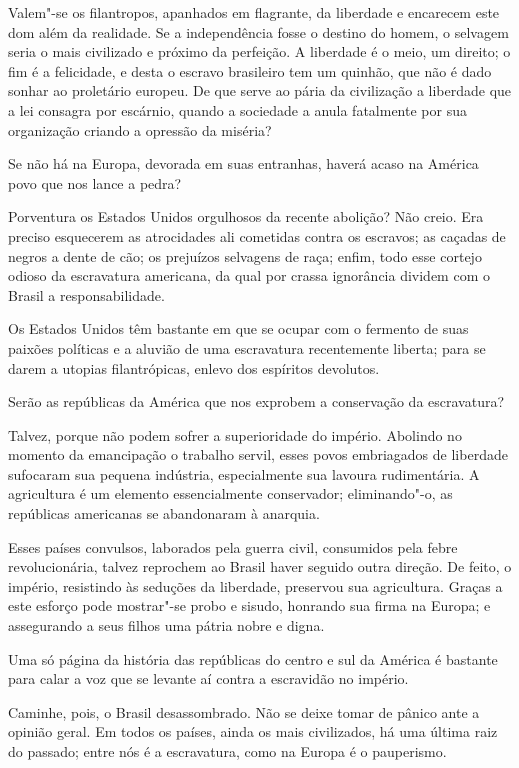  Valem"-se os filantropos, apanhados em flagrante, da liberdade e
encarecem este dom além da realidade. Se a independência fosse o
destino do homem, o selvagem seria o mais civilizado e próximo da
perfeição. A liberdade é o meio, um direito; o fim é a felicidade, e
desta o escravo brasileiro tem um quinhão, que não é dado sonhar ao
proletário europeu. De que serve ao pária da civilização a liberdade
que a lei consagra por escárnio, quando a sociedade a anula fatalmente
por sua organização criando a opressão da miséria? 

 Se não há na Europa, devorada em suas entranhas, haverá acaso na
América povo que nos lance a pedra?

 Porventura os Estados Unidos orgulhosos da recente abolição? Não creio.
Era preciso esquecerem as atrocidades ali cometidas contra os escravos;
as caçadas de negros a dente de cão; os prejuízos selvagens de raça;
enfim, todo esse cortejo odioso da escravatura americana, da qual por
crassa ignorância dividem com o Brasil a responsabilidade. 

 Os Estados Unidos têm bastante em que se ocupar com o fermento de suas
paixões políticas e a aluvião de uma escravatura recentemente liberta;
para se darem a utopias filantrópicas, enlevo dos espíritos devolutos. 

 Serão as repúblicas da América que nos exprobem a conservação da escravatura? 

 Talvez, porque não podem sofrer a superioridade do império. Abolindo no
momento da emancipação o trabalho servil, esses povos embriagados de
liberdade sufocaram sua pequena indústria, especialmente sua lavoura
rudimentária. A agricultura é um elemento essencialmente conservador;
eliminando"-o, as repúblicas americanas se abandonaram à anarquia. 

 Esses países convulsos, laborados pela guerra civil, consumidos pela
febre revolucionária, talvez reprochem ao Brasil haver seguido outra 
direção. De feito, o império, resistindo às seduções da liberdade,
preservou sua agricultura. Graças a este esforço pode mostrar"-se
probo e sisudo, honrando sua firma na Europa; e assegurando a seus
filhos uma pátria nobre e digna.

 Uma só página da história das repúblicas do centro e sul da América é
bastante para calar a voz que se levante aí contra a escravidão no império. 

 Caminhe, pois, o Brasil desassombrado. Não se deixe tomar de pânico
ante a opinião geral. Em todos os países, ainda os mais civilizados, há
uma última raiz do passado; entre nós é a escravatura, como na Europa é o pauperismo.

